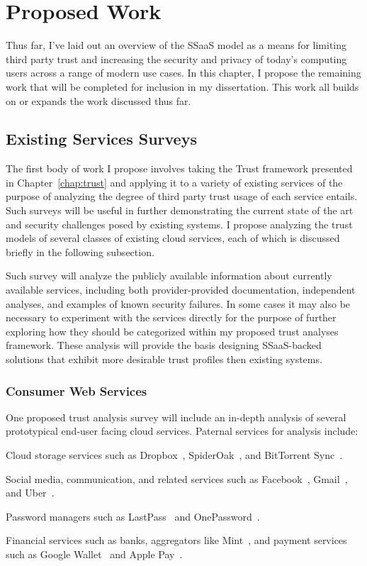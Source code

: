 \chapter{Proposed Work}
\label{chap:planned}

Thus far, I've laid out an overview of the SSaaS model as a means for
limiting third party trust and increasing the security and privacy of
today's computing users across a range of modern use cases. In this
chapter, I propose the remaining work that will be completed for
inclusion in my dissertation. This work all builds on or expands the
work discussed thus far.

\section{Existing Services Surveys}

The first body of work I propose involves taking the Trust framework
presented in Chapter~\ref{chap:trust} and applying it to a variety of
existing services of the purpose of analyzing the degree of third
party trust usage of each service entails. Such surveys will be
useful in further demonstrating the current state of the art and
security challenges posed by existing systems. I propose analyzing the
trust models of several classes of existing cloud services, each of
which is discussed briefly in the following subsection.

Such survey will analyze the publicly available information about
currently available services, including both provider-provided
documentation, independent analyses, and examples of known security
failures. In some cases it may also be necessary to experiment with the
services directly for the purpose of further exploring how they should
be categorized within my proposed trust analyses framework. These
analysis will provide the basis designing SSaaS-backed solutions that
exhibit more desirable trust profiles then existing systems.

\subsection{Consumer Web Services}

One proposed trust analysis survey will include an in-depth analysis of
several prototypical end-user facing cloud services. Paternal services
for analysis include:

\begin{packed_item}
\item Cloud storage services such as Dropbox~\cite{dropbox},
  SpiderOak~\cite{spideroak}, and BitTorrent
  Sync~\cite{bittorrent-sync}.
\item Social media, communication, and related services such as
  Facebook~\cite{facebook}, Gmail~\cite{google-gmail}, and
  Uber~\cite{uber}.
\item Password managers such as LastPass~\cite{lastpass} and
  OnePassword~\cite{onepassword}.
\item Financial services such as banks, aggregators like
  Mint~\cite{mint}, and payment services such as Google
  Wallet~\cite{google-wallet} and Apple Pay~\cite{apple-pay}.
\end{packed_item}

